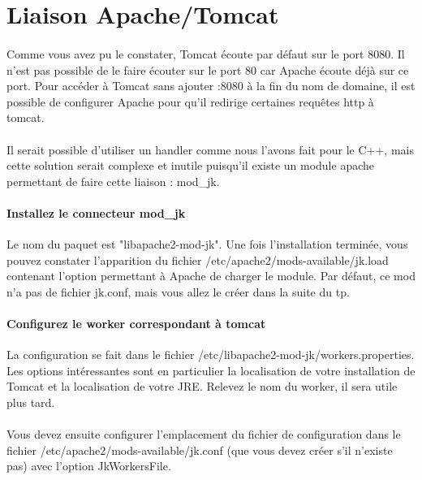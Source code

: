 \documentclass[12pt,a4paper]{article}
\begin{document}
\section{Liaison Apache/Tomcat}

\paragraph{}
Comme vous avez pu le constater, Tomcat écoute par défaut sur le port 8080. Il n'est pas possible de le faire écouter sur le port 80 car Apache écoute déjà sur ce port. Pour accéder à Tomcat sans ajouter :8080 à la fin du nom de domaine, il est possible de configurer Apache pour qu'il redirige certaines requêtes http à tomcat.

\paragraph{}
Il serait possible d'utiliser un handler comme nous l'avons fait pour le C++, mais cette solution serait complexe et inutile puisqu'il existe un module apache permettant de faire cette liaison : mod\_jk.

\paragraph{Installez le connecteur mod\_jk\\}
Le nom du paquet est "libapache2-mod-jk". Une fois l'installation terminée, vous pouvez constater l'apparition du fichier /etc/apache2/mods-available/jk.load contenant l'option permettant à Apache de charger le module. Par défaut, ce mod n'a pas de fichier jk.conf, mais vous allez le créer dans la suite du tp.

\paragraph{Configurez le worker correspondant à tomcat\\}
La configuration se fait dans le fichier /etc/libapache2-mod-jk/workers.properties. Les options intéressantes sont en particulier la localisation de votre installation de Tomcat et la localisation de votre JRE. Relevez le nom du worker, il sera utile plus tard.

\paragraph{}
Vous devez ensuite configurer l'emplacement du fichier de configuration dans le fichier /etc/apache2/mods-available/jk.conf (que vous devez créer s'il n'existe pas) avec l'option JkWorkersFile.
\end{document}
